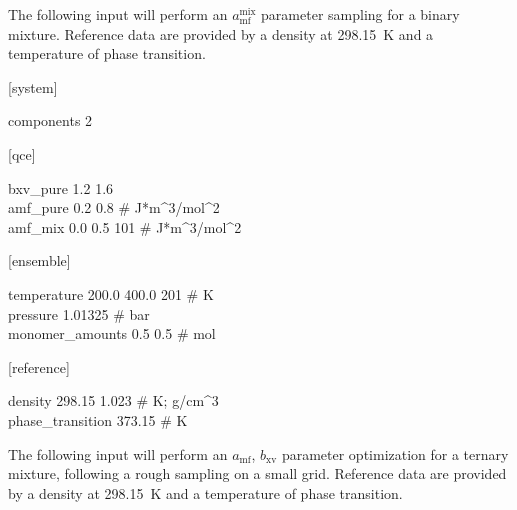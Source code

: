 \documentclass{scrartcl}
\newcommand{\amf}{a_\mathrm{mf}}
\newcommand{\bxv}{b_\mathrm{xv}}
\begin{document}
The following input will perform an $\amf^{\mathrm{mix}}$ parameter sampling for a binary mixture.
Reference data are provided by a density at \SI{298.15}{K} and a temperature of phase transition.

\begin{addmargin}[1cm]{0cm}
    \ttfamily
    \begin{minipage}{\textwidth}
        [system]
        \begin{addmargin}[1cm]{0cm}
            components 2
        \end{addmargin}
    \end{minipage}

    \begin{minipage}{\textwidth}
        [qce]
        \begin{addmargin}[1cm]{0cm}
            bxv\_pure 1.2 1.6 \\
            amf\_pure 0.2 0.8 \# J*m\^{}3/mol\^{}2 \\
            amf\_mix 0.0 0.5 101 \# J*m\^{}3/mol\^{}2
        \end{addmargin}
    \end{minipage}

    \begin{minipage}{\textwidth}
        [ensemble]
        \begin{addmargin}[1cm]{0cm}
            temperature 200.0 400.0 201 \# K \\
            pressure 1.01325 \# bar \\
            monomer\_amounts 0.5 0.5 \# mol
        \end{addmargin}
    \end{minipage}

    \begin{minipage}{\textwidth}
        [reference]
        \begin{addmargin}[1cm]{0cm}
            density 298.15 1.023 \# K; g/cm\^{}3 \\
            phase\_transition 373.15 \# K
        \end{addmargin}
    \end{minipage}
\end{addmargin}

The following input will perform an $\amf$, $\bxv$ parameter optimization for a ternary mixture, following a rough sampling on a small grid.
Reference data are provided by a density at \SI{298.15}{K} and a temperature of phase transition.
\end{document}
